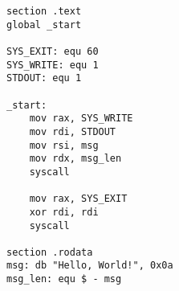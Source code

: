 \begin{verbatim}
section .text
global _start

SYS_EXIT: equ 60
SYS_WRITE: equ 1
STDOUT: equ 1

_start:
    mov rax, SYS_WRITE
    mov rdi, STDOUT
    mov rsi, msg
    mov rdx, msg_len
    syscall

    mov rax, SYS_EXIT
    xor rdi, rdi
    syscall

section .rodata
msg: db "Hello, World!", 0x0a
msg_len: equ $ - msg
\end{verbatim}

